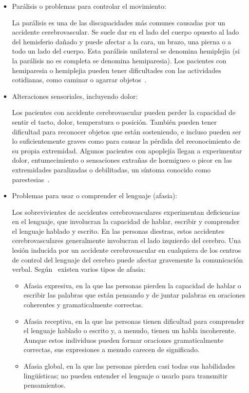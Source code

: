\begin{itemize}
    \item Parálisis o problemas para controlar el movimiento:
    
    La parálisis es una de las discapacidades más comunes causadas por un accidente cerebrovascular. Se suele dar en el lado del cuerpo opuesto al lado del hemisferio   dañado y puede afectar a la cara, un brazo, una pierna o a todo un lado del cuerpo. Esta parálisis unilateral se denomina hemiplejia (si la parálisis no es completa se denomina hemiparesia). Los pacientes con hemiparesia o hemiplejia pueden tener dificultades con las actividades cotidianas, como caminar o agarrar objetos~\cite{cuidadosalpacienteadulto}.

    \item Alteraciones sensoriales, incluyendo dolor:
    
    Los pacientes con accidente cerebrovascular pueden perder la capacidad de sentir el tacto, dolor, temperatura o posición. También pueden tener dificultad para reconocer objetos que están sosteniendo, e incluso pueden ser lo suficientemente graves como para causar la pérdida del reconocimiento de su propia extremidad. Algunos pacientes con apoplejía llegan a experimentar dolor, entumecimiento o sensaciones extrañas de hormigueo o picor en las extremidades paralizadas o debilitadas, un síntoma conocido
    como parestesias~\cite{post-strok}.
    
    \item Problemas para usar o comprender el lenguaje (afasia):
    
    Los sobrevivientes de accidentes cerebrovasculares experimentan deficiencias en el lenguaje, que involucran la capacidad de hablar, escribir y comprender el lenguaje hablado y escrito. En las personas diestras, estos accidentes cerebrovasculares generalmente involucran el lado izquierdo del cerebro. Una lesión inducida por un accidente cerebrovascular en cualquiera de 
    los centros de control del lenguaje del cerebro puede afectar gravemente la comunicación verbal. Según~\cite{post-strok} existen varios tipos de afasia:
    \begin{itemize}
        \item Afasia expresiva, en la que las personas pierden la capacidad de hablar o escribir las palabras que están pensando y de juntar palabras en oraciones coherentes y gramaticalmente correctas.
        \item Afasia receptiva, en la que las personas tienen dificultad para comprender el lenguaje hablado o escrito y, a menudo, tienen un habla incoherente. Aunque estos individuos pueden formar oraciones gramaticalmente correctas, sus expresiones a menudo carecen de significado.
        \item Afasia global, en la que las personas pierden casi todas sus habilidades lingüísticas; no pueden entender el lenguaje o usarlo para transmitir pensamientos.  
    \end{itemize}


\end{itemize}
